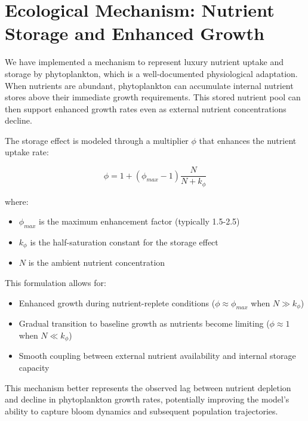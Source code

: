 \section{Ecological Mechanism: Nutrient Storage and Enhanced Growth}

We have implemented a mechanism to represent luxury nutrient uptake and storage by phytoplankton, which is a well-documented physiological adaptation. When nutrients are abundant, phytoplankton can accumulate internal nutrient stores above their immediate growth requirements. This stored nutrient pool can then support enhanced growth rates even as external nutrient concentrations decline.

The storage effect is modeled through a multiplier $\phi$ that enhances the nutrient uptake rate:

\[\phi = 1 + (\phi_{max} - 1) \frac{N}{N + k_\phi}\]

where:
\begin{itemize}
\item $\phi_{max}$ is the maximum enhancement factor (typically 1.5-2.5)
\item $k_\phi$ is the half-saturation constant for the storage effect
\item $N$ is the ambient nutrient concentration
\end{itemize}

This formulation allows for:
\begin{itemize}
\item Enhanced growth during nutrient-replete conditions ($\phi \approx \phi_{max}$ when $N \gg k_\phi$)
\item Gradual transition to baseline growth as nutrients become limiting ($\phi \approx 1$ when $N \ll k_\phi$)
\item Smooth coupling between external nutrient availability and internal storage capacity
\end{itemize}

This mechanism better represents the observed lag between nutrient depletion and decline in phytoplankton growth rates, potentially improving the model's ability to capture bloom dynamics and subsequent population trajectories.
